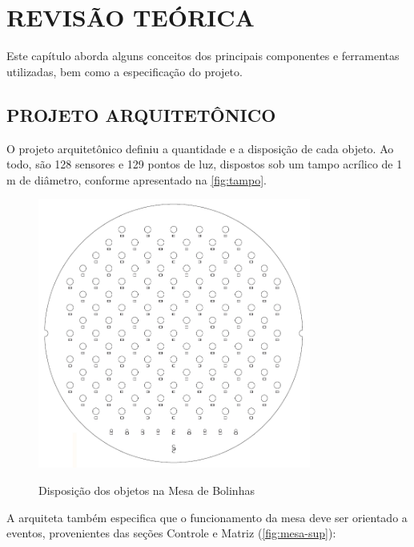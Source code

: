 
\chapter{REVISÃO TEÓRICA}
\label{chap:fundamentacaoTeorica}

Este capítulo aborda alguns conceitos dos principais componentes e ferramentas utilizadas, bem como a especificação do projeto.

\section{PROJETO ARQUITETÔNICO}
\label{sec:matrizLed}

O projeto arquitetônico definiu a quantidade e a disposição de cada objeto. Ao todo, são 128 sensores e 129 pontos de luz, dispostos sob um tampo acrílico de {1 m} de diâmetro, conforme apresentado na \autoref{fig:tampo}.

\begin{figure}[H]
    \centering
    \caption{Disposição dos objetos na Mesa de Bolinhas}
    \includegraphics[width=0.8\textwidth]{./dados/figuras/tampo}
    \label{fig:tampo}
\end{figure}

A arquiteta também especifica que o funcionamento da mesa deve ser orientado a eventos, provenientes das seções Controle e Matriz (\autoref{fig:mesa-sup}):

